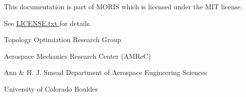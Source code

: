 
\vspace{1.8cm}

\centerline{This documentation is part of MORIS which is licensed under the MIT license. }
\centerline{See \href{https://github.com/kkmaute/moris/blob/main/LICENSE.txt}{LICENSE.txt \ExternalLink} for details.}

\vspace{1.5cm}

\centerline{Topology Optimiation Research Group}
\centerline{Aerospace Mechanics Research Center (AMReC)}
\centerline{Ann \& H. J. Smead Department of Aerospace Engineering Sciences}
\centerline{University of Colorado Boulder}


\newpage
